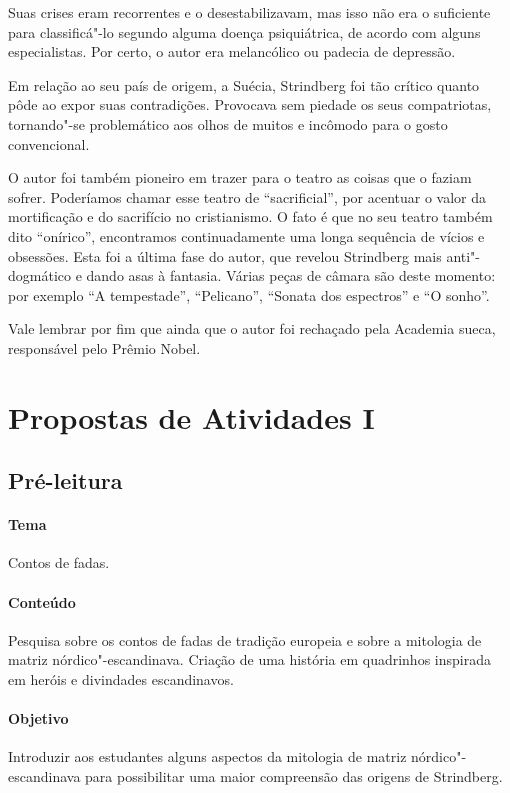 \documentclass[12pt]{extarticle}
\begin{document}
Suas crises eram recorrentes e o desestabilizavam, mas isso não era o suficiente para classificá"-lo 
segundo alguma doença psiquiátrica, de acordo com alguns especialistas. 
Por certo, o autor era melancólico ou padecia de depressão.

Em relação ao seu país de origem, a Suécia, Strindberg foi tão 
crítico quanto pôde ao expor suas contradições.
Provocava sem piedade os seus compatriotas, tornando"-se problemático aos olhos de muitos e incômodo para o gosto convencional.

O autor foi também pioneiro em trazer para o teatro as coisas que o faziam sofrer. Poderíamos chamar esse teatro de ``sacrificial'', por acentuar o valor da mortificação e do sacrifício no cristianismo. 
O fato é que no seu teatro também dito ``onírico'', encontramos continuadamente uma longa sequência 
de vícios e obsessões. Esta foi a última fase do autor, que revelou Strindberg mais anti"-dogmático e dando asas à fantasia. Várias peças de câmara são deste momento: por exemplo ``A tempestade'', ``Pelicano'', ``Sonata dos espectros'' e ``O sonho''.


Vale lembrar por fim que ainda que o autor foi rechaçado pela Academia sueca, responsável pelo Prêmio Nobel.



\section{Propostas de Atividades I}


\subsection{Pré-leitura}

\paragraph{Tema} Contos de fadas.

\paragraph{Conteúdo} Pesquisa sobre os contos de fadas de tradição europeia e sobre a mitologia de matriz nórdico"-escandinava. Criação de uma história em quadrinhos inspirada em heróis e divindades escandinavos.

\paragraph{Objetivo} Introduzir aos estudantes alguns aspectos da mitologia de matriz nórdico"-escandinava para possibilitar uma maior compreensão das origens de Strindberg.
\end{document}
